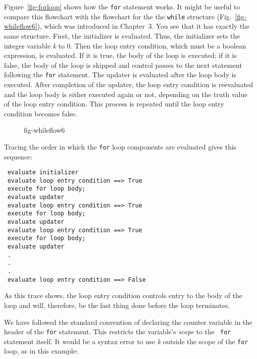 Figure~\ref{fig-forloop} shows how the {\tt for} statement works.  It
might be useful to compare this flowchart with the flowchart for the the
{\tt while} structure (Fig.~\ref{fig-whileflow6}), which was
introduced in Chapter~3.  You see that it has exactly the same
structure.  First, the initializer is evaluated.  Thus, the initializer
sets the integer variable {\it k} to 0.  Then the loop entry
condition, which must be a boolean expression, is evaluated.  If it is
true, the body of the loop is executed; if it is false, the body of
the loop is skipped and control passes to the next statement following
the {\tt for} statement.  The updater is evaluated after the loop body is
executed.  After completion of the updater, the loop entry condition
is reevaluated and the loop body is either executed again or not,
depending on the truth value of the loop entry condition.  This
process is repeated until the loop entry condition becomes false.

\begin{figure}[h!]
{fig-whileflow6}
\end{figure}

Tracing the order in which the {\tt for} loop components are
evaluated gives this sequence:

\begin{jjjlisting}
\begin{lstlisting}
 evaluate initializer
 evaluate loop entry condition ==> True
 execute for loop body;
 evaluate updater
 evaluate loop entry condition ==> True
 execute for loop body;
 evaluate updater
 evaluate loop entry condition ==> True
 execute for loop body;
 evaluate updater
 .
 .
 .
 evaluate loop entry condition ==> False
\end{lstlisting}
\end{jjjlisting}

\noindent As this trace shows, the loop entry condition controls
entry to the body of the loop and will, therefore, be the last thing
done before the loop terminates.

We have followed the standard convention of declaring the counter
variable in the header of the {\tt for} statement.  This restricts the
 variable's {\it scope} to the {\tt
for} statement itself.  It would be a syntax error to use {\it k}
outside the scope of the {\tt for} loop, as in this example:

